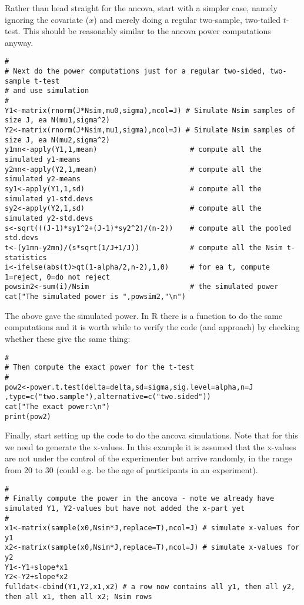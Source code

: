 \documentclass[12pt,a4paper]{article}
\theoremstyle{regla}
\theoremstyle{remark}
\theoremstyle{definition}
\theoremstyle{nonumberbreak}
\begin{document}
\begin{xmpl}
Rather than head straight for the ancova, start with a simpler case, namely ignoring the covariate ($x$) and merely doing a regular two-sample, two-tailed $t$-test.  This should be reasonably similar to the ancova power computations anyway.

\begin{lstlisting}
#
# Next do the power computations just for a regular two-sided, two-sample t-test
# and use simulation
#
Y1<-matrix(rnorm(J*Nsim,mu0,sigma),ncol=J) # Simulate Nsim samples of size J, ea N(mu1,sigma^2)
Y2<-matrix(rnorm(J*Nsim,mu1,sigma),ncol=J) # Simulate Nsim samples of size J, ea N(mu2,sigma^2)
y1mn<-apply(Y1,1,mean)                      # compute all the simulated y1-means
y2mn<-apply(Y2,1,mean)                      # compute all the simulated y2-means
sy1<-apply(Y1,1,sd)                         # compute all the simulated y1-std.devs
sy2<-apply(Y2,1,sd)                         # compute all the simulated y2-std.devs
s<-sqrt(((J-1)*sy1^2+(J-1)*sy2^2)/(n-2))    # compute all the pooled std.devs
t<-(y1mn-y2mn)/(s*sqrt(1/J+1/J))            # compute all the Nsim t-statistics
i<-ifelse(abs(t)>qt(1-alpha/2,n-2),1,0)     # for ea t, compute 1=reject, 0=do not reject
powsim2<-sum(i)/Nsim                        # the simulated power
cat("The simulated power is ",powsim2,"\n")
\end{lstlisting}

The above gave the simulated power.  In R there is a function to do the same computations and it is worth while to verify the code (and approach) by checking whether these give the same thing:

\begin{lstlisting}
#
# Then compute the exact power for the t-test
#
pow2<-power.t.test(delta=delta,sd=sigma,sig.level=alpha,n=J ,type=c("two.sample"),alternative=c("two.sided"))
cat("The exact power:\n")
print(pow2)
\end{lstlisting}

Finally, start setting up the code to do the ancova simulations.  Note that for this we need to generate the x-values.  In this example it is assumed that the x-values are not under the control of the experimenter but arrive randomly, in the range from 20 to 30 (could e.g. be the age of participants in an experiment).

\begin{lstlisting}
#
# Finally compute the power in the ancova - note we already have simulated Y1, Y2-values but have not added the x-part yet
#
x1<-matrix(sample(x0,Nsim*J,replace=T),ncol=J) # simulate x-values for y1
x2<-matrix(sample(x0,Nsim*J,replace=T),ncol=J) # simulate x-values for y2
Y1<-Y1+slope*x1
Y2<-Y2+slope*x2
fulldat<-cbind(Y1,Y2,x1,x2) # a row now contains all y1, then all y2, then all x1, then all x2; Nsim rows
\end{lstlisting}


\end{xmpl}
\end{document}
